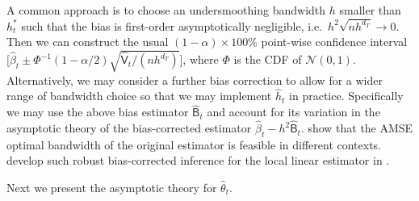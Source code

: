 \documentclass[lettersize, 12pt]{article}
\newtheorem{theorem}{Theorem}
\begin{document}
%
%

A common approach is to choose an undersmoothing bandwidth $h$ smaller than $h^\ast_t$ such that the bias is first-order asymptotically negligible, i.e.\ $h^2\sqrt{nh^{d_T}} \rightarrow 0$.  
Then we can construct the usual $(1-\alpha)\times 100\%$ point-wise confidence interval $\Big[\hat \beta_t \pm \Phi^{-1}(1-\alpha/2) \sqrt{\hat{\mathsf{V}}_t/(nh^{d_T})} \Big]$, where $\Phi$ is the CDF of $\mathcal{N}(0,1)$.
Alternatively, we may consider a further bias correction to allow for a wider range of bandwidth choice so that we may implement $\hat h_t$ in practice. 
Specifically we may use the above bias estimator $\hat{\mathsf{B}}_t$ and account for its variation in the asymptotic theory of the bias-corrected estimator $\hat\beta_t - h^2\hat{\mathsf{B}}_t$.  
\cite{CCF} show that the AMSE optimal bandwidth of the original estimator is feasible in different contexts.
\cite{Westling} develop such robust bias-corrected inference for the local linear estimator in \cite{Kennedy}.


Next we present the asymptotic theory for $\hat \theta_t$.
\end{document}

